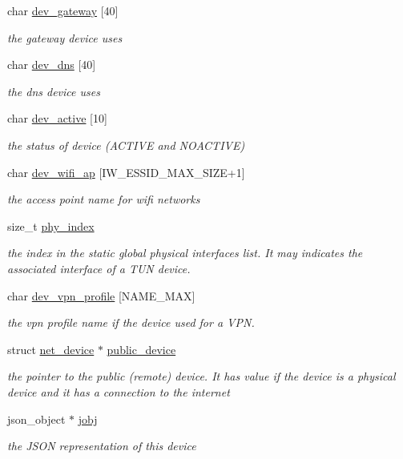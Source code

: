 \begin{DoxyCompactItemize}
char \hyperlink{structnet__device_ad708824b9b388d466795dc764d6fc477}{dev\+\_\+gateway} \mbox{[}40\mbox{]}
\begin{DoxyCompactList}\small\item\em the gateway device uses \end{DoxyCompactList}\item 
char \hyperlink{structnet__device_ac9ae8e657fb43f5baafd0fafcee819fa}{dev\+\_\+dns} \mbox{[}40\mbox{]}
\begin{DoxyCompactList}\small\item\em the dns device uses \end{DoxyCompactList}\item 
char \hyperlink{structnet__device_a1759ef9f942f991bff24268b2fc90c59}{dev\+\_\+active} \mbox{[}10\mbox{]}
\begin{DoxyCompactList}\small\item\em the status of device (A\+C\+T\+I\+VE and N\+O\+A\+C\+T\+I\+VE) \end{DoxyCompactList}\item 
char \hyperlink{structnet__device_a5f2de2bdeda68898f48a0d9347239e04}{dev\+\_\+wifi\+\_\+ap} \mbox{[}I\+W\+\_\+\+E\+S\+S\+I\+D\+\_\+\+M\+A\+X\+\_\+\+S\+I\+ZE+1\mbox{]}
\begin{DoxyCompactList}\small\item\em the access point name for wifi networks \end{DoxyCompactList}\item 
size\+\_\+t \hyperlink{structnet__device_a793c401280eb3afa81db485466aa77f2}{phy\+\_\+index}
\begin{DoxyCompactList}\small\item\em the index in the static global physical interfaces list. It may indicates the associated interface of a T\+UN device. \end{DoxyCompactList}\item 
char \hyperlink{structnet__device_ab9c29f0a4280c9f26bfedd0d7fd39789}{dev\+\_\+vpn\+\_\+profile} \mbox{[}N\+A\+M\+E\+\_\+\+M\+AX\mbox{]}
\begin{DoxyCompactList}\small\item\em the vpn profile name if the device used for a V\+PN. \end{DoxyCompactList}\item 
struct \hyperlink{structnet__device}{net\+\_\+device} $\ast$ \hyperlink{structnet__device_aa50aa45beac692be04baf4faf9d063d4}{public\+\_\+device}
\begin{DoxyCompactList}\small\item\em the pointer to the public (remote) device. It has value if the device is a physical device and it has a connection to the internet \end{DoxyCompactList}\item 
json\+\_\+object $\ast$ \hyperlink{structnet__device_ae3906a433b76b87e2c54069df9d5a342}{jobj}
\begin{DoxyCompactList}\small\item\em the J\+S\+ON representation of this device \end{DoxyCompactList}\end{DoxyCompactItemize}


